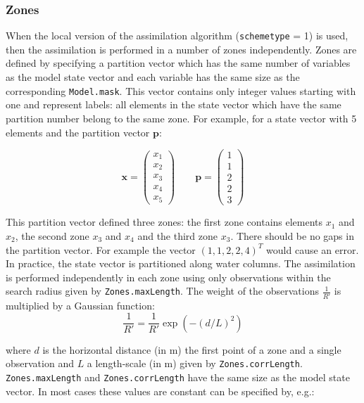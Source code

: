\documentclass[a4paper,12pt]{article}
\newcommand{\code}{\texttt}
\begin{document}
\subsubsection{Zones}

When the local version of the assimilation algorithm (\code{schemetype} = 1) is used, then the assimilation is performed in a number of zones independently. Zones are defined by specifying a partition vector which has the same number of variables as the model state vector and each variable has the same size as the corresponding \code{Model.mask}. This vector contains only integer values starting with one and represent labels: all elements in the state vector which have the same partition number belong to the same zone. For example, for a state vector with 5 elements and the partition vector $\mathbf p$:

\begin{equation}
\mathbf x = 
\left( 
\begin{array}{c}
x_1 \\
x_2 \\
x_3 \\
x_4 \\
x_5
\end{array}
\right) 
\qquad
\mathbf p = 
\left( 
\begin{array}{c}
1 \\
1 \\
2 \\
2 \\
3
\end{array}
\right) 
\end{equation}

This partition vector defined three zones: the first zone contains elements $x_1$ and $x_2$, the second zone $x_3$ and $x_4$ and the third zone $x_3$. There should be no gaps in the partition vector. For example the vector $(1,1,2,2,4)^T$ would cause an error. 
In practice, the state vector is partitioned along water columns.
The assimilation is performed independently in each zone using only observations within the search radius given by 
\code{Zones.maxLength}. The weight of the observations $\frac{1}{R'}$ is multiplied by a Gaussian function:
\begin{equation}
\frac{1}{R'} = \frac{1}{R'} \exp(- (d/L)^2)
\end{equation}

where $d$ is the horizontal distance (in m) the first point of a zone and a single observation and $L$ a length-scale (in m) given by \code{Zones.corrLength}. \code{Zones.maxLength} and \code{Zones.corrLength} have the same size as the model state vector. In most cases these values are constant can be specified by, e.g.:
\end{document}
